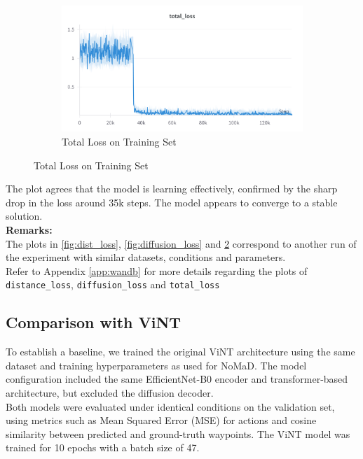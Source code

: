 \documentclass[12pt]{article}
\begin{document}
\begin{figure}[H]
    \centering
    \begin{subfigure}[b]{0.8\textwidth}
        \centering
        \includegraphics[width=\textwidth]{images/total_loss.png}
        \caption{Total Loss on Training Set}
        \label{fig:total_loss}
    \end{subfigure}
    \end{figure}
The plot agrees that the model is learning effectively, confirmed by the sharp drop in the loss around 35k steps. The model appears to converge to a stable solution.\\

\noindent \textbf{Remarks:}\\
The plots in \ref{fig:dist_loss}, \ref{fig:diffusion_loss} and \ref{fig:total_loss} correspond to another run of the experiment with similar datasets, conditions and parameters.\\
Refer to Appendix \ref{app:wandb} for more details regarding the plots of \texttt{distance\_loss}, \texttt{diffusion\_loss} and \texttt{total\_loss}

\subsection*{Comparison with ViNT}
To establish a baseline, we trained the original ViNT architecture using the same dataset and training hyperparameters as used for NoMaD. The model configuration included the same EfficientNet-B0 encoder and transformer-based architecture, but excluded the diffusion decoder.\\

Both models were evaluated under identical conditions on the validation set, using metrics such as Mean Squared Error (MSE) for actions and cosine similarity between predicted and ground-truth waypoints. The ViNT model was trained for 10 epochs with a batch size of 47.\\
\end{document}
